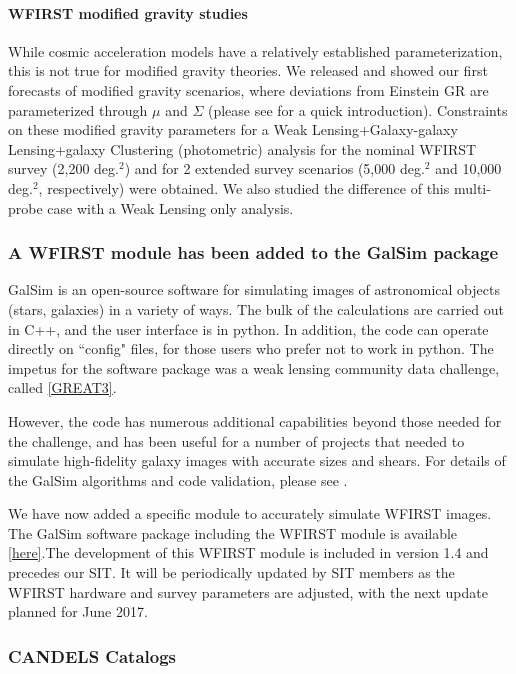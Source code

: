 \paragraph{WFIRST modified gravity studies} While cosmic acceleration models have a relatively established parameterization, this is not true for modified gravity theories. We released and showed our first forecasts of modified gravity scenarios, where deviations from Einstein GR are parameterized through $\mu$ and $\Sigma$ (please see \citet{Joyce:2016vqv} for a quick introduction). Constraints on these modified gravity parameters for a Weak Lensing+Galaxy-galaxy Lensing+galaxy Clustering (photometric) analysis for the nominal WFIRST survey (2,200 deg.$^2$) and for 2 extended survey scenarios (5,000 deg.$^2$ and 10,000 deg.$^2$, respectively) were obtained. We also studied the difference of this multi-probe case with a Weak Lensing only analysis.

\subsubsection{A WFIRST module has been added to the GalSim package}

GalSim is an open-source software for simulating images of astronomical objects (stars, galaxies) in a variety of ways. The bulk of the calculations are carried out in C++, and the user interface is in python. In addition, the code can operate directly on ``config" files, for those users who prefer not to work in python. The impetus for the software package was a weak lensing community data challenge, called \href{http://great3challenge.info/}{[GREAT3]}.

However, the code has numerous additional capabilities beyond those needed for the challenge, and has been useful for a number of projects that needed to simulate high-fidelity galaxy images with accurate sizes and shears. For details of the GalSim algorithms and code validation, please see \citet{Rowe:2015}.

We have now added a specific module to accurately simulate WFIRST images. The GalSim software package including the WFIRST module is available \href{https://github.com/GalSim-developers/GalSim}{[here]}.The development of this WFIRST module is included in version 1.4 and precedes our SIT. It will be periodically updated by SIT members as the WFIRST hardware and survey parameters are adjusted, with the next update planned for June 2017.

\subsubsection{CANDELS Catalogs}

